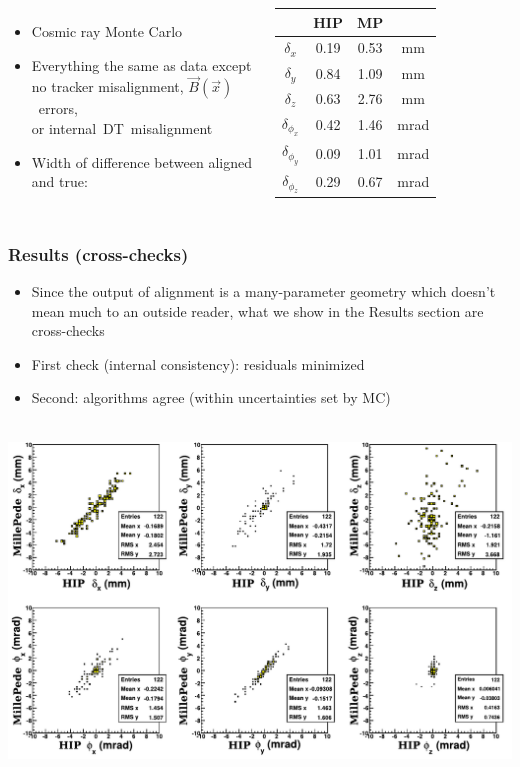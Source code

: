\documentclass[compress]{beamer}
\begin{document}
\begin{frame}
\begin{columns}

\begin{itemize}
\item Cosmic ray Monte Carlo
\item Everything the same as data except no tracker misalignment, \mbox{$\vec{B}(\vec{x})$ errors,\hspace{-1 cm}} \\ or \mbox{internal DT misalignment\hspace{-2 cm}}
\item Width of difference between aligned and true:
\end{itemize}

\begin{tabular}{c c c c}
& HIP & MP & \\\hline
$\delta_x$ & 0.19 & 0.53 & mm \\
$\delta_y$ & 0.84 & 1.09 & mm \\
$\delta_z$ & 0.63 & 2.76 & mm \\
$\delta_{\phi_x}$ & 0.42 & 1.46 & mrad \\
$\delta_{\phi_y}$ & 0.09 & 1.01 & mrad \\
$\delta_{\phi_z}$ & 0.29 & 0.67 & mrad \\
\end{tabular}

\end{columns}
\end{frame}

\begin{frame}
\frametitle{Results (cross-checks)}
\begin{itemize}
\item Since the output of alignment is a many-parameter geometry which
  doesn't mean much to an outside reader, what we show in the Results
  section are cross-checks
\item First check (internal consistency): residuals minimized
\item Second: algorithms agree (within uncertainties set by MC)
\end{itemize}

\mbox{ } \hfill \includegraphics[width=0.8\linewidth]{MP-V4_vs_HIP-V4.pdf} \hfill \mbox{ }
\end{frame}
\end{document}
